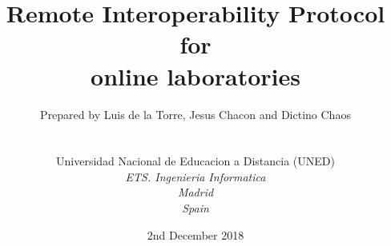 
\def\Company{Universidad Nacional de Educacion a Distancia (UNED)}
\def\Institute{\textit{ETS. Ingenieria Informatica}}
\def\City{\textit{Madrid}}
\def\Country{\textit{Spain}}

\def\BoldTitle{Remote Interoperability Protocol}

\def\Subtitle{for \\ online laboratories \\}
\def\Authors{Prepared by Luis de la Torre, Jesus Chacon and Dictino Chaos } 
\def\Shortname{L. de la Torre, J. Chacon, D. Chaos}


\title{\textbf{\BoldTitle}\\\Subtitle}
\author{\Authors \\ \\ \\ \Company \\ \Institute\\ \City\\ \Country}
\date{2nd December 2018}

